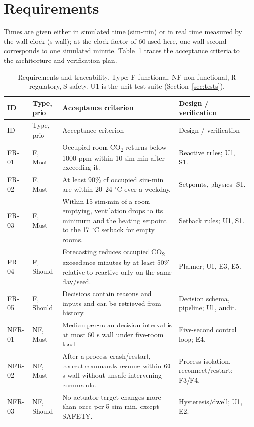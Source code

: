 \documentclass[11pt,a4paper]{article}
\begin{document}
\section{Requirements}
Times are given either in simulated time (sim-min) or in real time measured by the wall clock (s wall); at the clock factor of 60 used here, one wall second corresponds to one simulated minute. Table~\ref{tab:req} traces the acceptance criteria to the architecture and verification plan.
{\small\begin{longtable}{>{\raggedright\arraybackslash}p{15mm}>{\raggedright\arraybackslash}p{13mm}>{\raggedright\arraybackslash}p{77mm}>{\raggedright\arraybackslash}p{37mm}}
\caption{Requirements and traceability. Type: F functional, NF non-functional, R regulatory, S safety. U1 is the unit-test suite (Section~\ref{sec:tests}).}\label{tab:req}\\
\toprule ID & Type, prio & Acceptance criterion & Design / verification\\\midrule\endfirsthead
\toprule ID & Type, prio & Acceptance criterion & Design / verification\\\midrule\endhead
FR-01 & F, Must & Occupied-room CO\textsubscript{2} returns below 1000 ppm within 10 sim-min after exceeding it. & Reactive rules; U1, S1.\\
FR-02 & F, Must & At least 90\% of occupied sim-min are within 20--24 $^\circ$C over a weekday. & Setpoints, physics; S1.\\
FR-03 & F, Must & Within 15 sim-min of a room emptying, ventilation drops to its minimum and the heating setpoint to the 17 $^\circ$C setback for empty rooms. & Setback rules; U1, S1.\\
FR-04 & F, Should & Forecasting reduces occupied CO\textsubscript{2} exceedance minutes by at least 50\% relative to reactive-only on the same day/seed. & Planner; U1, E3, E5.\\
FR-05 & F, Should & Decisions contain reasons and inputs and can be retrieved from history. & Decision schema, pipeline; U1, audit.\\
NFR-01 & NF, Must & Median per-room decision interval is at most 60 s wall under five-room load. & Five-second control loop; E4.\\
NFR-02 & NF, Must & After a process crash/restart, correct commands resume within 60 s wall without unsafe intervening commands. & Process isolation, reconnect/restart; F3/F4.\\
NFR-03 & NF, Should & No actuator target changes more than once per 5 sim-min, except SAFETY. & Hysteresis/dwell; U1, E2.\\

\end{longtable}}
\end{document}

